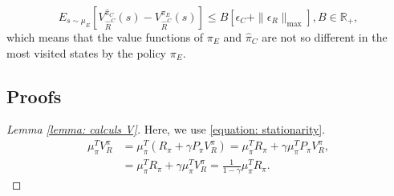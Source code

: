 \documentclass{article} %
\newtheorem{remark}{Remark}
\newcommand{\0}{\mathbf{0}}
\newcommand{\1}{\mathbf{1}}
\begin{document}
\begin{equation}
E_{s \sim \mu_E}[V^{\hat{\pi}_C}_{\hat{R}^C}(s)-V^{\pi_E}_{\hat{R}^C}(s)]\leq B[\epsilon_C+\|\epsilon_R\|_{\text{max}}], B\in\mathbb{R}_+,
\end{equation}
which means that the value functions of $\pi_E$ and $\hat{\pi}_C$ are not so different in the most visited states by the policy $\pi_E$.

\subsection{Proofs}

\begin{proof}[Lemma \ref{lemma: calculs V}]
Here, we use \eqref{equation: stationarity}.
\begin{align}
\mu_\pi^TV^\pi_R&=\mu_\pi^T(R_\pi+\gamma P_\pi V^\pi_R)=\mu_\pi^TR_\pi+ \gamma\mu_\pi^TP_\pi V^\pi_R,
\\
&=\mu_\pi^TR_\pi+ \gamma\mu_\pi^TV^\pi_R=\frac{1}{1-\gamma}\mu_\pi^TR_\pi.
\end{align}
\end{proof}

\end{document}
